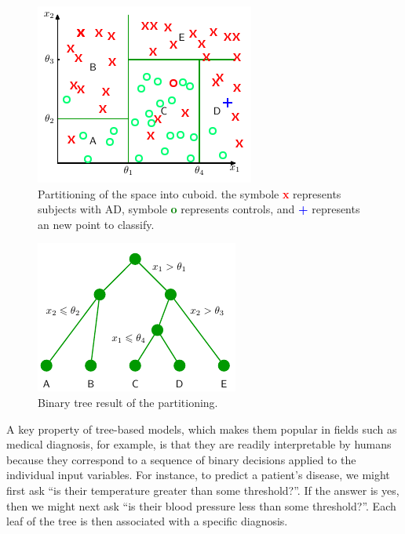 \documentclass[final, paper=letter,5p,times,twocolumn]{elsarticle}
\begin{document}
\begin{figure}[htbp]
   \begin{center}
      \includegraphics[scale=0.5, angle=0]{images/Decision_tree_space_cuboid_modified.png}
   \end{center}
   \caption{Partitioning of the space into cuboid. the symbole {\bf\textcolor{red}{x}} represents subjects with AD, symbole {\bf\textcolor{green}{o}} represents controls, and {\bf\textcolor{blue}{+}} represents an new point to classify.}
  \label{fig:DT_space_cuboid} 
\end{figure}

\begin{figure}[htbp]
   \begin{center}
      \includegraphics[scale=0.5, angle=0]{images/Decision_tree_binary_tree.png}
   \end{center}
   \caption{Binary tree result of the partitioning.}
  \label{fig:DT_binary_tree} 
\end{figure}

A key property of tree-based models, which makes them popular in fields such as medical diagnosis, for example, is that they are readily interpretable by humans because they correspond to a sequence of binary decisions applied to the individual input variables. For instance, to predict a patient's disease, we might first ask ``is their temperature greater than some threshold?''. If the answer is yes, then we might next ask ``is their blood pressure less than some threshold?''. Each leaf of the tree is then associated with a specific diagnosis. \\
\end{document}
